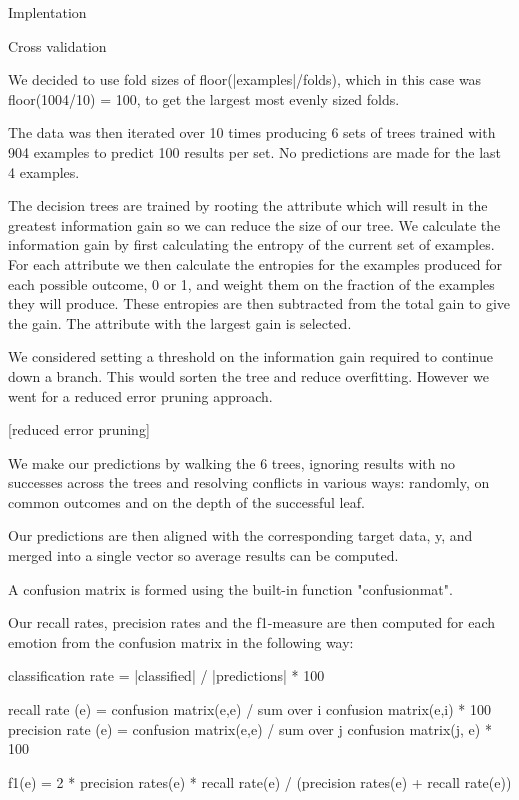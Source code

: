 Implentation

Cross validation

We decided to use fold sizes of floor(|examples|/folds), which in this case was floor(1004/10) = 100, to get the largest most evenly sized folds.

The data was then iterated over 10 times producing 6 sets of trees trained with 904 examples to predict 100 results per set. No predictions are made for the last 4 examples.

The decision trees are trained by rooting the attribute which will result in the greatest information gain so we can reduce the size of our tree. We calculate the information gain by first calculating the entropy of the current set of examples. For each attribute we then calculate the entropies for the examples produced for each possible outcome, 0 or 1, and weight them on the fraction of the examples they will produce. These entropies are then subtracted from the total gain to give the gain. The attribute with the largest gain is selected.

We considered setting a threshold on the information gain required to continue down a branch. This would sorten the tree and reduce overfitting. However we went for a reduced error pruning approach.

[reduced error pruning]

We make our predictions by walking the 6 trees, ignoring results with no successes across the trees and resolving conflicts in various ways: randomly, on common outcomes and on the depth of the successful leaf.

Our predictions are then aligned with the corresponding target data, y, and merged into a single vector so average results can be computed.

A confusion matrix is formed using the built-in function "confusionmat".

Our recall rates, precision rates and the f1-measure are then computed for each emotion from the confusion matrix in the following way:

classification rate = |classified| / |predictions| * 100

recall rate (e) = confusion matrix(e,e) / sum over i {confusion matrix(e,i)} * 100
precision rate (e) = confusion matrix(e,e) / sum over j {confusion matrix(j, e)} * 100

f1(e) = 2 * precision rates(e) * recall rate(e) / (precision rates(e) + recall rate(e)) 
